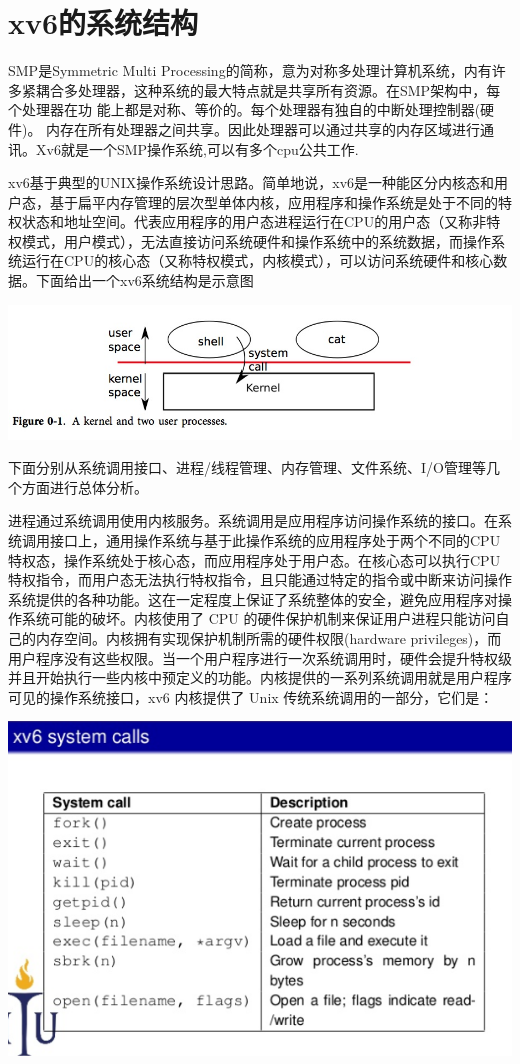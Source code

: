 \section{xv6的系统结构}

SMP是Symmetric Multi Processing的简称，意为对称多处理计算机系统，内有许多紧耦合多处理器，这种系统的最大特点就是共享所有资源。在SMP架构中，每个处理器在功 能上都是对称、等价的。每个处理器有独自的中断处理控制器(硬件)。 内存在所有处理器之间共享。因此处理器可以通过共享的内存区域进行通讯。Xv6就是一个SMP操作系统,可以有多个cpu公共工作.

xv6基于典型的UNIX操作系统设计思路。简单地说，xv6是一种能区分内核态和用户态，基于扁平内存管理的层次型单体内核，应用程序和操作系统是处于不同的特权状态和地址空间。代表应用程序的用户态进程运行在CPU的用户态（又称非特权模式，用户模式），无法直接访问系统硬件和操作系统中的系统数据，而操作系统运行在CPU的核心态（又称特权模式，内核模式），可以访问系统硬件和核心数据。下面给出一个xv6系统结构是示意图

\includegraphics[width=6in]{figures/struct/fig1.png}

下面分别从系统调用接口、进程/线程管理、内存管理、文件系统、I/O管理等几个方面进行总体分析。

进程通过系统调用使用内核服务。系统调用是应用程序访问操作系统的接口。在系统调用接口上，通用操作系统与基于此操作系统的应用程序处于两个不同的CPU特权态，操作系统处于核心态，而应用程序处于用户态。在核心态可以执行CPU特权指令，而用户态无法执行特权指令，且只能通过特定的指令或中断来访问操作系统提供的各种功能。这在一定程度上保证了系统整体的安全，避免应用程序对操作系统可能的破坏。内核使用了 CPU 的硬件保护机制来保证用户进程只能访问自己的内存空间。内核拥有实现保护机制所需的硬件权限(hardware privileges)，而用户程序没有这些权限。当一个用户程序进行一次系统调用时，硬件会提升特权级并且开始执行一些内核中预定义的功能。内核提供的一系列系统调用就是用户程序可见的操作系统接口，xv6 内核提供了 Unix 传统系统调用的一部分，它们是：

\includegraphics[width=6in]{figures/struct/fig2.png}

